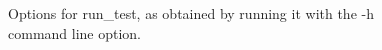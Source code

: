 \begin{figure}
{\scriptsize  }
\caption{Options for {\file run\_test}, as obtained by running it with the
  {\file -h} command line option.} \label{fig:runtest}
\end{figure}
